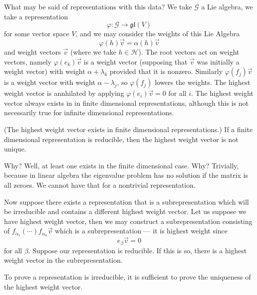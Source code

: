 What may be said of representations with this data? We take
$\mathscr{G}$ a Lie algebra, we take a representation
\begin{equation}
\varphi\colon\mathscr{G}\to\mathfrak{gl}(V)
\end{equation}
for some vector space $V$, and we may consider the weights of
this Lie Algebra
\begin{equation}
\varphi(h)\vec{v}=\alpha(h)\vec{v}
\end{equation}
and weight vectors $\vec{v}$ (where we take
$h\in\mathscr{H}$). The root vectors act on weight vectors,
namely $\varphi(e_{k})\vec{v}$ is a weight vector (supposing that
$\vec{v}$ was initially a weight vector) with weight
$\alpha+\lambda_{k}$ provided that it is nonzero. Similarly
$\varphi(f_{j})\vec{v}$ is a weight vector with weight
$\alpha-\lambda_{j}$, so $\varphi(f_{j})$ lowers the weights. The
highest weight vector is annhilated by applying
$\varphi(e_{i})\vec{v}=0$ for all $i$. The highest weight vector
always exists in in finite dimensional representations, although
this is not necessarily true for infinite dimensional
representations. 

\begin{thm} {\rm(The highest weight vector exists in finite
    dimensional representations.)} If a finite dimensional
  representation is reducible, then the highest weight vector is
  not unique.
\end{thm}

Why? Well, at least one exists in the finite dimensional
case. Why? Trivially, because in linear algebra the eigenvalue
problem has no solution if the matrix is all zeroes. We cannot
have that for a nontrivial representation. 

Now suppose there exists a representation that is a
subrepresentation which will be irreducible and contains a
different highest weight vector. Let us suppose we have highest
weight vector, then we may construct a subrepresentation
consisting of
$f_{\alpha_{1}}(\cdots{})f_{\alpha_{n}}\vec{v}$ which
is a subrepresentation --- it is highest weight since
\begin{equation}
e_{\beta}\vec{v}=0
\end{equation}
for all $\beta$. Suppose our representation is reducible. If this
is so, there is a highest weight vector in the subrepresentation.

\begin{rmk}
To prove a representation is irreducible, it is sufficient to
prove the uniqueness of the highest weight vector.
\end{rmk}

